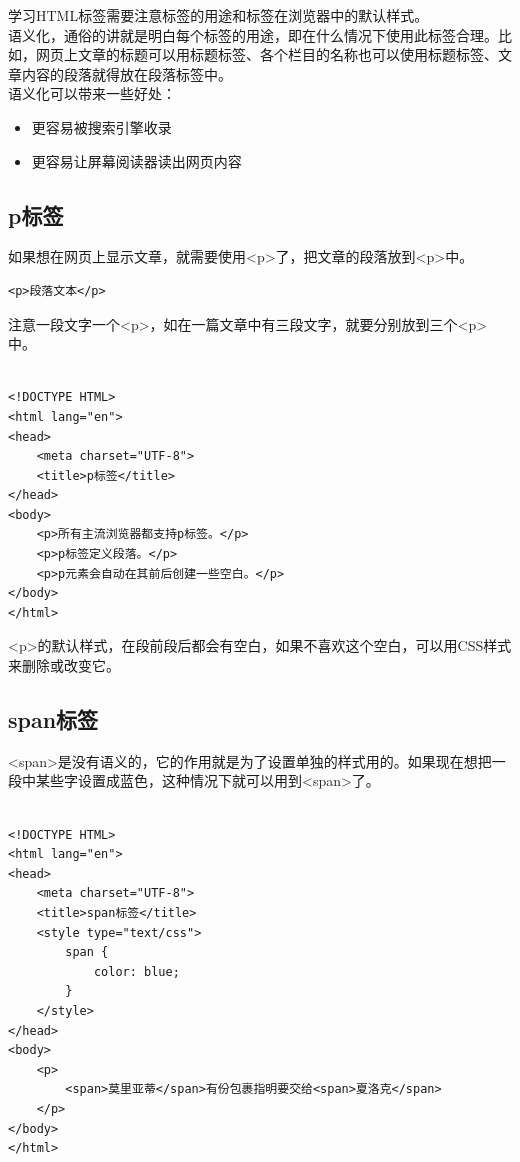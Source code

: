 学习HTML标签需要注意标签的用途和标签在浏览器中的默认样式。 \\

语义化，通俗的讲就是明白每个标签的用途，即在什么情况下使用此标签合理。比如，网页上文章的标题可以用标题标签、各个栏目的名称也可以使用标题标签、文章内容的段落就得放在段落标签中。 \\

语义化可以带来一些好处：

\begin{itemize}
	\item 更容易被搜索引擎收录
	\item 更容易让屏幕阅读器读出网页内容
\end{itemize}

\subsection{p标签}

如果想在网页上显示文章，就需要使用<p>了，把文章的段落放到<p>中。 \\

\begin{lstlisting}[style=htmlcssjs]
<p>段落文本</p>
\end{lstlisting}

注意一段文字一个<p>，如在一篇文章中有三段文字，就要分别放到三个<p>中。 \\

 \\
\begin{lstlisting}[style=htmlcssjs]
<!DOCTYPE HTML>
<html lang="en">
<head>
    <meta charset="UTF-8">
    <title>p标签</title>
</head>
<body>
    <p>所有主流浏览器都支持p标签。</p>
    <p>p标签定义段落。</p>
    <p>p元素会自动在其前后创建一些空白。</p>
</body>
</html>
\end{lstlisting}

<p>的默认样式，在段前段后都会有空白，如果不喜欢这个空白，可以用CSS样式来删除或改变它。

\subsection{span标签}

<span>是没有语义的，它的作用就是为了设置单独的样式用的。如果现在想把一段中某些字设置成蓝色，这种情况下就可以用到<span>了。 \\

 \\
\begin{lstlisting}[style=htmlcssjs]
<!DOCTYPE HTML>
<html lang="en">
<head>
    <meta charset="UTF-8">
    <title>span标签</title>
    <style type="text/css">
        span {
            color: blue;
        }
    </style>
</head>
<body>
    <p>
        <span>莫里亚蒂</span>有份包裹指明要交给<span>夏洛克</span>
    </p>
</body>
</html>
\end{lstlisting}

